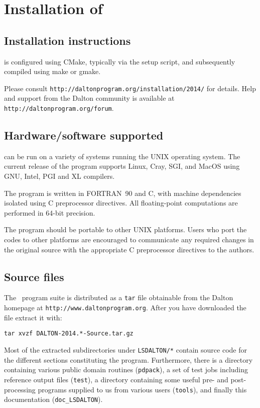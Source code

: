 \chapter{Installation of \lsdalton}\label{ch:install}

\section{Installation instructions}

{\lsdalton} is configured using CMake, typically via the setup script,
and subsequently compiled using make or gmake.

Please consult \verb|http://daltonprogram.org/installation/2014/| for details.
Help and support from the Dalton community is available at \verb|http://daltonprogram.org/forum|.

\section{Hardware/software supported}
{\lsdalton} can be run on a variety of systems running the UNIX operating system.
The current release of the program supports Linux, Cray, SGI,
and MacOS using GNU, Intel, PGI and XL compilers.

The program is written in FORTRAN~90 and C, with machine dependencies
isolated using C preprocessor directives.  All
floating-point computations are performed in 64-bit precision.

The program should be portable to other UNIX platforms.  Users
who port the codes to other platforms are encouraged to communicate any
required changes in the original source with the appropriate C preprocessor
directives to the authors.

\section{Source files}\label{sec:source}

The \latestrelease\ program suite is distributed as a \verb|tar|
file obtainable from
the Dalton homepage at \verb|http://www.daltonprogram.org|.
After you have downloaded the file extract it with:
\begin{verbatim}
tar xvzf DALTON-2014.*-Source.tar.gz
\end{verbatim}
Most of the extracted subdirectories under \verb|LSDALTON/*| contain source code for the different
sections constituting the {\lsdalton} program.
Furthermore, there is a directory containing various public domain routines (\verb|pdpack|), a set of test jobs including reference output files (\verb|test|), a directory
containing some useful pre- and post-processing programs supplied to us from
various users (\verb|tools|), and finally this documentation (\verb|doc_LSDALTON|). 

